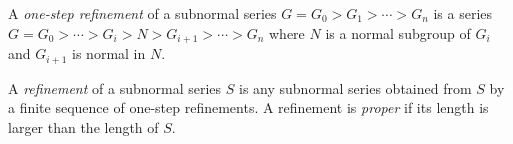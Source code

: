 A \emph{one-step refinement} of a subnormal series $G = G_0 > G_1 > \cdots > G_n$ is a series $G = G_0 > \cdots > G_i > N > G_{i+1} > \cdots > G_n$ where $N$ is a normal subgroup of $G_i$ and $G_{i+1}$ is normal in $N$.

A \emph{refinement} of a subnormal series $S$ is any subnormal series obtained from $S$ by a finite sequence of one-step refinements. A refinement is \emph{proper} if its length is larger than the length of $S$.
